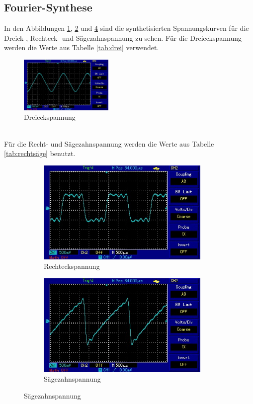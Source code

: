 \newpage
\subsection{Fourier-Synthese}
In den Abbildungen \ref{fig:drei}, \ref{fig:recht} und \ref{fig:säge} sind die synthetisierten
Spannungskurven für die Dreick-, Rechteck- und Sägezahnspannung zu sehen.
Für die Dreieckspannung werden die Werte aus Tabelle \ref{tab:drei} verwendet.

\begin{figure}
  \centering
  \includegraphics[width=0.4\textwidth]{bilder/dreieck.jpg}
  \caption{Dreieckspannung}
  \label{fig:drei}
\end{figure} \\

Für die Recht- und Sägezahnspannung werden die Werte aus Tabelle \ref{tab:rechtsäge}
benutzt.

\begin{figure}
  \centering
  \begin{subfigure}{0.8\textwidth}
    \centering
    \includegraphics[height=5cm]{bilder/rechteck.jpg}
    \caption{Rechteckspannung}
    \label{fig:recht}
  \end{subfigure}
  \begin{subfigure}{0.8\textwidth}
    \centering
    \includegraphics[height=5cm]{bilder/saegezahn.jpg}
    \caption{Sägezahnspannung}
    \label{fig:säge}
  \end{subfigure}
\end{figure}
